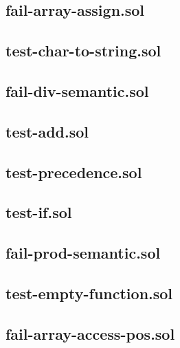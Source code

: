 \subsection{fail-array-assign.sol}


\subsection{test-char-to-string.sol}


\subsection{fail-div-semantic.sol}


\subsection{test-add.sol}


\subsection{test-precedence.sol}


\subsection{test-if.sol}


\subsection{fail-prod-semantic.sol}


\subsection{test-empty-function.sol}


\subsection{fail-array-access-pos.sol}


